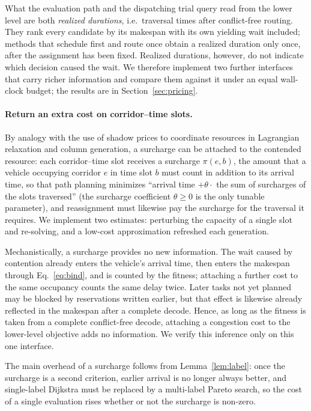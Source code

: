 What the evaluation path and the dispatching trial query read from the lower level are both \emph{realized durations}, i.e.\ traversal times after conflict-free routing. They rank every candidate by its makespan with its own yielding wait included; methods that schedule first and route once obtain a realized duration only once, after the assignment has been fixed. Realized durations, however, do not indicate which decision caused the wait. We therefore implement two further interfaces that carry richer information and compare them against it under an equal wall-clock budget; the results are in Section~\ref{sec:pricing}.

\paragraph{Return an extra cost on corridor--time slots.}
By analogy with the use of shadow prices to coordinate resources in Lagrangian relaxation and column generation, a surcharge can be attached to the contended resource: each corridor--time slot receives a surcharge $\pi(e,b)$, the amount that a vehicle occupying corridor $e$ in time slot $b$ must count in addition to its arrival time,
so that path planning minimizes ``arrival time $+\theta\cdot$ the sum of surcharges of the slots traversed'' (the surcharge coefficient $\theta\ge0$ is the only tunable parameter), and reassignment must likewise pay the surcharge for the traversal it requires.
We implement two estimates: perturbing the capacity of a single slot and re-solving, and a low-cost approximation refreshed each generation.

Mechanistically, a surcharge provides no new information. The wait caused by contention already enters the vehicle's arrival time, then enters the makespan through Eq.~\eqref{eq:bind}, and is counted by the fitness;
attaching a further cost to the same occupancy counts the same delay twice. Later tasks not yet planned may be blocked by reservations written earlier, but that effect is likewise already reflected in the makespan after a complete decode.
Hence, as long as the fitness is taken from a complete conflict-free decode, attaching a congestion cost to the lower-level objective adds no information. We verify this inference only on this one interface.

The main overhead of a surcharge follows from Lemma~\ref{lem:label}: once the surcharge is a second criterion, earlier arrival is no longer always better, and single-label Dijkstra must be replaced by a multi-label Pareto search,
so the cost of a single evaluation rises whether or not the surcharge is non-zero.


